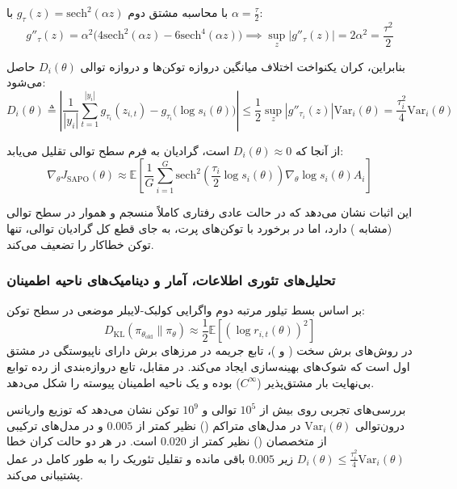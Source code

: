 با محاسبه مشتق دوم $g_\tau(z) = \text{sech}^2(\alpha z)$ با $\alpha = \frac{\tau}{2}$:
\begin{equation}
	\label{eq:second_derivative}
	g''_\tau(z) = \alpha^2 \big( 4\text{sech}^2(\alpha z) - 6\text{sech}^4(\alpha z) \big) \implies \sup_z |g''_\tau(z)| = 2\alpha^2 = \frac{\tau^2}{2}
\end{equation}

بنابراین، کران یکنواخت اختلاف میانگین دروازه توکن‌ها و دروازه توالی $D_i(\theta)$ حاصل می‌شود:
\begin{equation}
	\label{eq:uniform_bound}
	D_i(\theta) \triangleq \left| \frac{1}{|y_i|} \sum_{t=1}^{|y_i|} g_{\tau_i}(z_{i,t}) - g_{\tau_i}\big(\log s_i(\theta)\big) \right| \le \frac{1}{2} \sup_z |g''_{\tau_i}(z)| \text{Var}_i(\theta) = \frac{\tau_i^2}{4} \text{Var}_i(\theta)
\end{equation}

از آنجا که $D_i(\theta) \approx 0$ است، گرادیان  به فرم سطح توالی تقلیل می‌یابد:
\begin{equation}
	\label{eq:sapo_gspo_reduction}
	\nabla_\theta J_{\text{SAPO}}(\theta) \approx \mathbb{E} \left[ \frac{1}{G} \sum_{i=1}^G \text{sech}^2\left(\frac{\tau_i}{2} \log s_i(\theta)\right) \nabla_\theta \log s_i(\theta) \hat{A}_i \right]
\end{equation}

این اثبات نشان می‌دهد که  در حالت عادی رفتاری کاملاً منسجم و هموار در سطح توالی (مشابه ) دارد، اما در برخورد با توکن‌های پرت، به جای قطع کل گرادیان توالی، تنها توکن خطاکار را تضعیف می‌کند.

\subsubsection*{تحلیل‌های تئوری اطلاعات، آمار و دینامیک‌های ناحیه اطمینان}

بر اساس بسط تیلور مرتبه دوم واگرایی کولبک-لایبلر موضعی در سطح توکن:
\begin{equation}
	D_{\text{KL}}(\pi_{\theta_{\text{old}}} \parallel \pi_\theta) \approx \frac{1}{2} \mathbb{E}\left[ (\log r_{i,t}(\theta))^2 \right]
\end{equation}
در روش‌های برش سخت ( و )، تابع جریمه در مرزهای برش دارای ناپیوستگی در مشتق اول است که شوک‌های بهینه‌سازی ایجاد می‌کند. در مقابل، تابع دروازه‌بندی  از رده توابع بی‌نهایت بار مشتق‌پذیر ($C^\infty$) بوده و یک ناحیه اطمینان پیوسته را شکل می‌دهد.

بررسی‌های تجربی روی بیش از $10^5$ توالی و $10^9$ توکن نشان می‌دهد که توزیع واریانس درون‌توالی $\text{Var}_i(\theta)$ در مدل‌های متراکم () نظیر  کمتر از $0.005$ و در مدل‌های ترکیبی از متخصصان () نظیر  کمتر از $0.020$ است. در هر دو حالت کران خطا $D_i(\theta) \le \frac{\tau_i^2}{4}\text{Var}_i(\theta)$ زیر $0.005$ باقی مانده و تقلیل تئوریک را به طور کامل در عمل پشتیبانی می‌کند.

